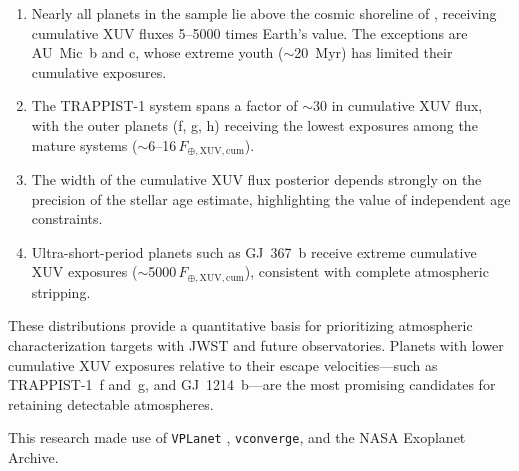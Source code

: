 \documentclass[twocolumn]{aastex631}
\newcommand{\vplanet}{\texttt{VPLanet}}
\newcommand{\vconverge}{\texttt{vconverge}}
\newcommand{\Fearth}{F_{\oplus,\mathrm{XUV,cum}}}
\begin{document}
\begin{enumerate}
  \item Nearly all planets in the sample lie above the cosmic shoreline of
    \citet{ZahnleCatling2017}, receiving cumulative XUV fluxes 5--5000 times
    Earth's value. The exceptions are AU~Mic~b and c, whose extreme youth
    ($\sim$20~Myr) has limited their cumulative exposures.
  \item The TRAPPIST-1 system spans a factor of $\sim$30 in cumulative XUV
    flux, with the outer planets (f, g, h) receiving the lowest exposures
    among the mature systems ($\sim$6--16$\,\Fearth$).
  \item The width of the cumulative XUV flux posterior depends strongly on the
    precision of the stellar age estimate, highlighting the value of
    independent age constraints.
  \item Ultra-short-period planets such as GJ~367~b receive extreme cumulative
    XUV exposures ($\sim$5000$\,\Fearth$), consistent with complete atmospheric
    stripping.
\end{enumerate}

These distributions provide a quantitative basis for prioritizing atmospheric
characterization targets with JWST and future observatories. Planets with lower
cumulative XUV exposures relative to their escape velocities---such as
TRAPPIST-1~f and~g, and GJ~1214~b---are the most promising candidates for
retaining detectable atmospheres.

\begin{acknowledgments}
This research made use of \vplanet{} \citep{Barnes2020}, \vconverge{}, and
the NASA Exoplanet Archive.
\end{acknowledgments}


\end{document}
